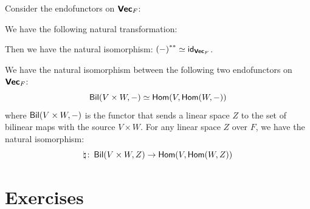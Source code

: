 \begin{example}
  Consider the endofunctors on $\Vect_F$:
  \begin{center}
  \end{center}
  We have the following natural transformation:
  \begin{center}
  \end{center}
  Then we have the natural isomorphism: ${(-)}^{**} \simeq \id_{\Vect_F}$.
\end{example}

\begin{example}\label{ex:bilinear_natural_isomorphism}
  We have the natural isomorphism between the following two endofunctors on $\Vect_F$:
  \[
    \Bil(V \times W, -) \simeq \Hom(V, \Hom(W, -))
  \]
  where $\Bil(V \times W, -)$ is the functor that sends a linear space $Z$ to the set of bilinear maps with the source $V \times W$. For any linear space $Z$ over $F$, we have the natural isomorphism:
  \[
    \natural \colon \Bil(V \times W, Z) \to \Hom(V, \Hom(W, Z))
  \]
\end{example}

\clearpage{}

\section{Exercises}

